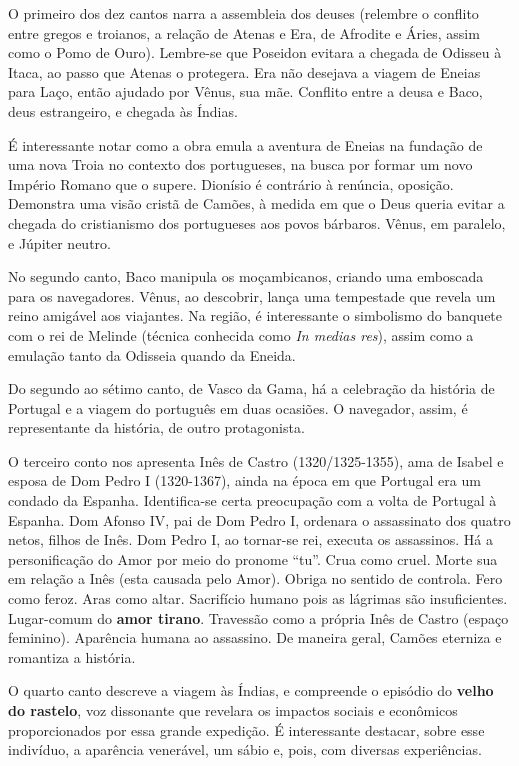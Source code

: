 O primeiro dos dez cantos narra a assembleia dos deuses (relembre o conflito entre gregos e troianos, a relação de Atenas e Era, de Afrodite e Áries, assim como o Pomo de Ouro). Lembre-se que Poseidon evitara a chegada de Odisseu à Itaca, ao passo que Atenas o protegera. Era não desejava a viagem de Eneias para Laço, então ajudado por Vênus, sua mãe. Conflito entre a deusa e Baco, deus estrangeiro, e chegada às Índias. 

É interessante notar como a obra emula a aventura de Eneias na fundação de uma nova Troia no contexto dos portugueses, na busca por formar um novo Império Romano que o supere. Dionísio é contrário à renúncia, oposição. Demonstra uma visão cristã de Camões, à medida em que o Deus queria evitar a chegada do cristianismo dos portugueses aos povos bárbaros. Vênus, em paralelo, e Júpiter neutro. 

No segundo canto, Baco manipula os moçambicanos, criando uma emboscada para os navegadores. Vênus, ao descobrir, lança uma tempestade que revela um reino amigável aos viajantes. Na região, é interessante o simbolismo do banquete com o rei de Melinde (técnica conhecida como \textit{In medias res}), assim como a emulação tanto da Odisseia quando da Eneida. 

Do segundo ao sétimo canto, de Vasco da Gama, há a celebração da história de Portugal e a viagem do português em duas ocasiões. O navegador, assim, é representante da história, de outro protagonista. 

O terceiro conto nos apresenta Inês de Castro (1320/1325-1355), ama de Isabel e esposa de Dom Pedro I (1320-1367), ainda na época em que Portugal era um condado da Espanha. Identifica-se certa preocupação com a volta de Portugal à Espanha. Dom Afonso IV, pai de Dom Pedro I, ordenara o assassinato dos quatro netos, filhos de Inês. Dom Pedro I, ao tornar-se rei, executa os assassinos. Há a personificação do Amor por meio do pronome ``tu''. Crua como cruel. Morte sua em relação a Inês (esta causada pelo Amor). Obriga no sentido de controla. Fero como feroz. Aras como altar. Sacrifício humano pois as lágrimas são insuficientes. Lugar-comum do \textbf{amor tirano}. Travessão como a própria Inês de Castro (espaço feminino). Aparência humana ao assassino. De maneira geral, Camões eterniza e romantiza a história. 

O quarto canto descreve a viagem às Índias, e compreende o episódio do \textbf{velho do rastelo}, voz dissonante que revelara os impactos sociais e econômicos proporcionados por essa grande expedição. É interessante destacar, sobre esse indivíduo, a aparência venerável, um sábio e, pois, com diversas experiências.


